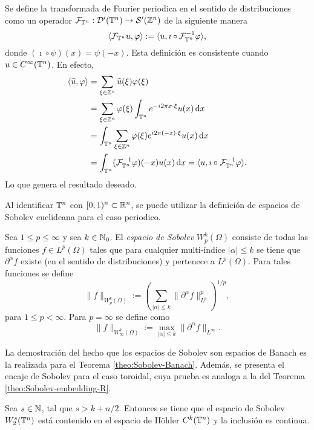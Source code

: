 \begin{definition}
	Se define la transformada de Fourier periodica en el sentido de distribuciones como un operador $\mathcal{F}_{\mathbb{T}^n}:\mathcal{D}'(\mathbb{T}^n)\to\mathcal{S}'(\mathbb{Z}^n)$ de la siguiente manera
	\begin{equation*}
		\langle\mathcal{F}_{\mathbb{T}^n}u, \varphi\rangle := \langle u, \imath \circ \mathcal{F}_{\mathbb{T}^n}^{-1}\varphi\rangle,
	\end{equation*}
	donde $(\imath\circ\psi)(x) = \psi(-x)$. Esta definición es consistente cuando $u\in C^\infty(\mathbb{T}^n)$. En efecto, 
	\begin{align*}
		\langle\widehat{u}, \varphi\rangle &= \sum_{\xi\in\mathbb{Z}^n}\widehat{u}(\xi)\varphi(\xi)\\
		& = \sum_{\xi\in\mathbb{Z}^n} \varphi(\xi) \int_{\mathbb{T}^n}e^{-i2\pi x\cdot\xi}  u(x) \mathop{}\!\mathrm{d} x \\
		& =\int_{\mathbb{T}^n}  \sum_{\xi\in\mathbb{Z}^n} \varphi(\xi) e^{i2\pi (-x)\cdot\xi}u(x)\mathop{}\!\mathrm{d} x \\
		& = \int_{\mathbb{T}^n} (\mathcal{F}_{\mathbb{T}^n}^{-1}\varphi)(-x) u(x) \mathop{}\!\mathrm{d} x = \langle u, \imath\circ \mathcal{F}_{\mathbb{T}^n}^{-1}\varphi\rangle.
	\end{align*}
	Lo que genera el resultado deseado.
\end{definition}
Al identificar $\mathbb{T}^n$ con $[0,1)^n\subset\mathbb{R}^n$, se puede utilizar la definición de espacios de Sobolev euclideana para el caso periodico.
\begin{definition}
	Sea $1\leq p \leq\infty$ y sea $k\in\mathbb{N}_0$. El \textit{espacio de Sobolev} $W^k_p(\Omega)$ consiste de todas las funciones $f\in L^p(\Omega)$ tales que para cualquier multi-índice $|\alpha|\leq k$ se tiene que $\partial^\alpha f$ existe (en el sentido de distribuciones) y pertenece a $L^p(\Omega)$. Para tales funciones se define 
	\begin{equation*}
		\|f\|_{W^k_p(\Omega)} := \left( \sum_{|\alpha|\leq k} \|\partial^\alpha f\|_{L^p}^p
		\right)^{1/p},
	\end{equation*}
	para $1\leq p <\infty$. Para $p=\infty$ se define como 
	\begin{equation*}
		\|f\|_{W^k_\infty(\Omega)} := \max_{|\alpha|\leq k} \|\partial^\alpha f\|_{L^\infty}.
	\end{equation*}
\end{definition}
La demostración del hecho que los espacios de Sobolev son espacios de Banach es la realizada para el Teorema \ref{theo:Sobolev-Banach}. Además, se presenta el encaje de Sobolev para el caso toroidal, cuya prueba es analoga a la del Teorema \ref{theo:Sobolev-embedding-R}.
\begin{theorem}\label{theo:Sobolev-embedding-T}
	Sea $s\in\mathbb{N}$, tal que $s>k+n/2$. Entonces se tiene que el espacio de Sobolev $W^s_2(\mathbb{T}^n)$ está contenido en el espacio de H\"older $C^k(\mathbb{T}^n)$ y la inclusión es continua.
\end{theorem}
